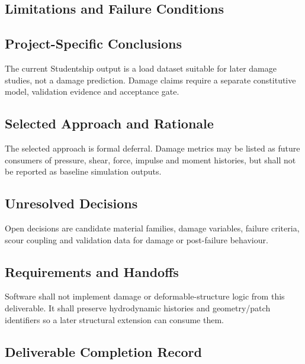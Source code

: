 
\subsection{Limitations and Failure Conditions}
\label{sec:res-str-dmg-limitations}


\subsection{Project-Specific Conclusions}
\label{sec:res-str-dmg-conclusions}

The current Studentship output is a load dataset suitable for later
damage studies, not a damage prediction. Damage claims require a
separate constitutive model, validation evidence and acceptance gate.

\subsection{Selected Approach and Rationale}
\label{sec:res-str-dmg-selected-approach}

The selected approach is formal deferral. Damage metrics may be listed
as future consumers of pressure, shear, force, impulse and moment
histories, but shall not be reported as baseline simulation outputs.

\subsection{Unresolved Decisions}
\label{sec:res-str-dmg-unresolved-decisions}

Open decisions are candidate material families, damage variables,
failure criteria, scour coupling and validation data for damage or
post-failure behaviour.

\subsection{Requirements and Handoffs}
\label{sec:res-str-dmg-requirements}

Software shall not implement damage or deformable-structure logic from
this deliverable. It shall preserve hydrodynamic histories and
geometry/patch identifiers so a later structural extension can consume
them.

\subsection{Deliverable Completion Record}
\label{sec:res-str-dmg-completion-record}

%
%
%
